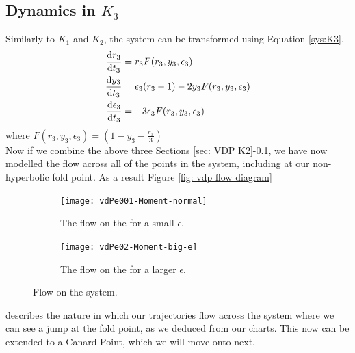 \subsection{Dynamics in \texorpdfstring{$K_3$}{K3}}\label{sec:dynamics-in-texorpdfstringk3k3}
Similarly to $K_1$ and $K_2$, the system can be transformed using Equation \ref{sys:K3}.
\begin{align*}
\od{r_3}{t_3}&=r_3F(r_3,y_3,\epsilon_3)\\
\od{y_3}{t_3}&=\epsilon_3(r_3-1)-2y_3F(r_3,y_3,\epsilon_3)\\
\od{\epsilon_3}{t_3}&=-3\epsilon_3F(r_3,y_3,\epsilon_3)
\end{align*}
where $F(r_3,y_3,\epsilon_3)=\left(1-y_3-\frac{r_3}{3}\right)$ \\
 

Now if we combine the above three Sections \ref{sec: VDP K2}-\ref{sec:dynamics-in-texorpdfstringk3k3}, we have now modelled the flow across all of the points in the \vdp system, including at our non-hyperbolic fold point. As a result Figure \ref{fig: vdp flow diagram}
\begin{figure}[h!]\centering
		\begin{subfigure}[t]{0.45\textwidth}
			\centering
			\texttt{[image: vdPe001-Moment-normal]}
			\caption{The flow on the \vdp for a small $ \epsilon $.} \label{fig: vdp normal}
		\end{subfigure}
		\hfill
		\begin{subfigure}[t]{0.45\textwidth}
			\centering
			\texttt{[image: vdPe02-Moment-big-e]}
			\caption{The flow on the \vdp for a larger $ \epsilon $.} \label{fig: vdp big e}
		\end{subfigure}
		
	\caption{Flow on the \vdp system.}
	\label{fig: vdp flow diagram e}
\end{figure}\newpage
describes the nature in which our trajectories flow across the system where we can see a jump at the fold point, as we deduced from our charts. This now can be extended to a Canard Point, which we will move onto next. 
\newpage